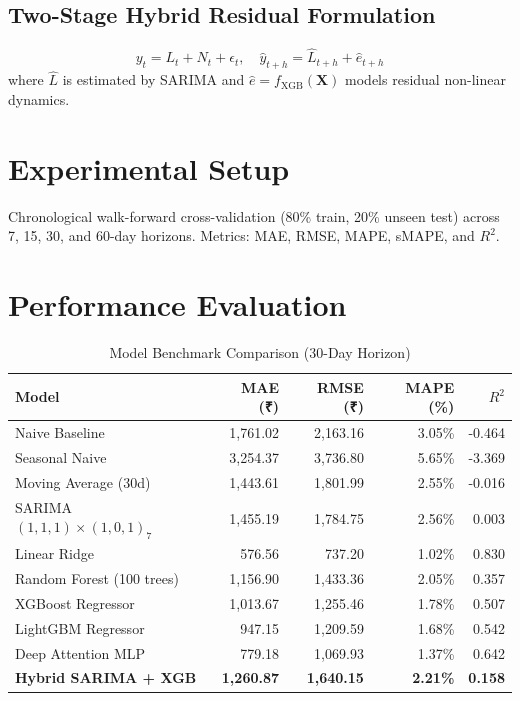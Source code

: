 \documentclass[journal,10pt,twocolumn]{IEEEtran}
\begin{document}
\subsection{Two-Stage Hybrid Residual Formulation}
\begin{equation}
y_t = L_t + N_t + \epsilon_t, \quad \hat{y}_{t+h} = \hat{L}_{t+h} + \hat{e}_{t+h}
\end{equation}
where $\hat{L}$ is estimated by SARIMA and $\hat{e} = f_{\text{XGB}}(\mathbf{X})$ models residual non-linear dynamics.

\section{Experimental Setup}
Chronological walk-forward cross-validation (80\% train, 20\% unseen test) across 7, 15, 30, and 60-day horizons. Metrics: MAE, RMSE, MAPE, sMAPE, and $R^2$.

\section{Performance Evaluation}
\begin{table}[htbp]
\caption{Model Benchmark Comparison (30-Day Horizon)}
\centering
\begin{tabular}{lrrrr}
\toprule
\textbf{Model} & \textbf{MAE (₹)} & \textbf{RMSE (₹)} & \textbf{MAPE (\%)} & \textbf{$R^2$} \\
\midrule
Naive Baseline & 1,761.02 & 2,163.16 & 3.05\% & -0.464 \\
Seasonal Naive & 3,254.37 & 3,736.80 & 5.65\% & -3.369 \\
Moving Average (30d) & 1,443.61 & 1,801.99 & 2.55\% & -0.016 \\
SARIMA$(1,1,1)\times(1,0,1)_7$ & 1,455.19 & 1,784.75 & 2.56\% & 0.003 \\
Linear Ridge & 576.56 & 737.20 & 1.02\% & 0.830 \\
Random Forest (100 trees) & 1,156.90 & 1,433.36 & 2.05\% & 0.357 \\
XGBoost Regressor & 1,013.67 & 1,255.46 & 1.78\% & 0.507 \\
LightGBM Regressor & 947.15 & 1,209.59 & 1.68\% & 0.542 \\
Deep Attention MLP & 779.18 & 1,069.93 & 1.37\% & 0.642 \\
\textbf{Hybrid SARIMA + XGB} & \textbf{1,260.87} & \textbf{1,640.15} & \textbf{2.21\%} & \textbf{0.158} \\
\bottomrule
\end{tabular}
\end{table}
\end{document}
